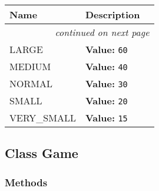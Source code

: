     \vspace{-1cm}
\hspace{\varindent}\begin{longtable}{|p{\varnamewidth}|p{\vardescrwidth}|l}
\cline{1-2}
\cline{1-2} \centering \textbf{Name} & \centering \textbf{Description}& \\
\cline{1-2}
\endhead\cline{1-2}\multicolumn{3}{r}{\small\textit{continued on next page}}\\\endfoot\cline{1-2}
\endlastfoot\raggedright L\-A\-R\-G\-E\- & \raggedright \textbf{Value:} 
{\tt 60}&\\
\cline{1-2}
\raggedright M\-E\-D\-I\-U\-M\- & \raggedright \textbf{Value:} 
{\tt 40}&\\
\cline{1-2}
\raggedright N\-O\-R\-M\-A\-L\- & \raggedright \textbf{Value:} 
{\tt 30}&\\
\cline{1-2}
\raggedright S\-M\-A\-L\-L\- & \raggedright \textbf{Value:} 
{\tt 20}&\\
\cline{1-2}
\raggedright V\-E\-R\-Y\-\_\-S\-M\-A\-L\-L\- & \raggedright \textbf{Value:} 
{\tt 15}&\\
\cline{1-2}
\end{longtable}



\subsection{Class Game}

    \label{pygame-asteroids:game:Game}


  \subsubsection{Methods}

